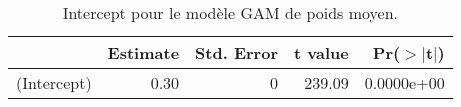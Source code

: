 \begin{table}[!ht]
\centering
\begin{tabular}{rrrrr}
  \hline
 & Estimate & Std. Error & t value & Pr($>$$|$t$|$) \\ 
  \hline
(Intercept) & 0.30 &    0 & 239.09 & 0.0000e+00 \\ 
   \hline
\end{tabular}
\caption{Intercept pour le modèle GAM de poids moyen.} 
\label{smpm.pc}
\end{table}
